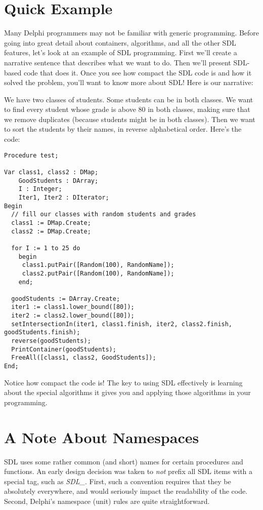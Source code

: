 \documentclass{report}
\begin{document}
\chapter{Quick Example}

Many Delphi programmers may not be familiar with generic programming. Before
going into great detail about containers, algorithms, and all the other SDL
features, let's look at an example of SDL programming. First we'll create a
narrative sentence that describes what we want to do. Then we'll present
SDL-based code that does it.  Once you see how compact the SDL code is and
how it solved the problem, you'll want to know more about SDL! Here is our
narrative:

We have two classes of students. Some students can be in both classes. We
want to find every student whose grade is above 80 in both classes, making
sure that we remove duplicates (because students might be in both classes).
Then we want to sort the students by their names, in reverse alphabetical
order. Here's the code:

\begin{lstlisting}
Procedure test;

Var class1, class2 : DMap;
    GoodStudents : DArray;
    I : Integer;
    Iter1, Iter2 : DIterator;
Begin
  // fill our classes with random students and grades
  class1 := DMap.Create;
  class2 := DMap.Create;
 
  for I := 1 to 25 do
    begin
     class1.putPair([Random(100), RandomName]);
     class2.putPair([Random(100), RandomName]);
    end;

  goodStudents := DArray.Create;
  iter1 := class1.lower_bound([80]);
  iter2 := class2.lower_bound([80]);
  setIntersectionIn(iter1, class1.finish, iter2, class2.finish, goodStudents.finish);
  reverse(goodStudents);
  PrintContainer(goodStudents);
  FreeAll([class1, class2, GoodStudents]);
End;
\end{lstlisting}

Notice how compact the code is! The key to using SDL effectively is learning
about the special algorithms it gives you and applying those algorithms in
your programming.

\chapter{A Note About Namespaces}

SDL uses some rather common (and short) names for certain procedures and
functions. An early design decision was taken to \emph{not} prefix all SDL
items with a special tag, such as \emph{SDL\_}. First, such a convention
requires that they be absolutely everywhere, and would seriously impact the
readability of the code. Second, Delphi's namespace (unit) rules are quite
straightforward.
\end{document}
